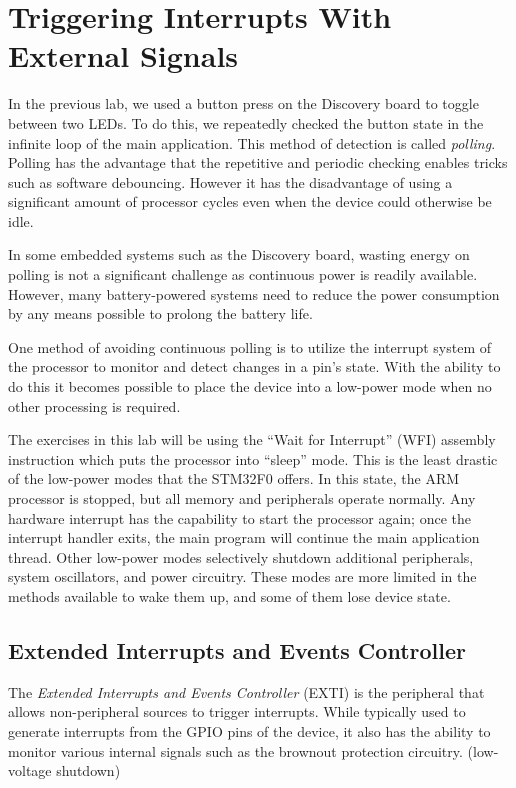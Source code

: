 \documentclass[11pt,fleqn]{book} %
\begin{document}
\section{Triggering Interrupts With External Signals}

In the previous lab, we used a button press on the Discovery board to toggle between two LEDs. To do this, we repeatedly checked the button state in the infinite loop of the main application. This method of detection is called \textit{polling}. Polling has the advantage that the repetitive and periodic checking enables tricks such as software debouncing. However it has the disadvantage of using a significant amount of processor cycles even when the device could otherwise be idle. 

In some embedded systems such as the Discovery board, wasting energy on polling is not a significant challenge as continuous power is readily available. However, many battery-powered systems need to reduce the power consumption by any means possible to prolong the battery life.

One method of avoiding continuous polling is to utilize the interrupt system of the processor to monitor and detect changes in a pin's state. With the ability to do this it becomes possible to place the device into a low-power mode when no other processing is required. 

The exercises in this lab will be using the ``Wait for Interrupt'' (WFI) assembly instruction which puts the processor into ``sleep'' mode. This is the least drastic of the low-power modes that the STM32F0 offers. In this state, the ARM processor is stopped, but all memory and peripherals operate normally. Any hardware interrupt has the capability to start the processor again; once the interrupt handler exits, the main program will continue the main application thread. Other low-power modes selectively shutdown additional peripherals, system oscillators, and power circuitry. These modes are more limited in the methods available to wake them up, and some of them lose device state.  

\subsection{Extended Interrupts and Events Controller} \label{exti}

The \textit{Extended Interrupts and Events Controller} (EXTI) is the peripheral that allows non-peripheral sources to trigger interrupts. While typically used to generate interrupts from the GPIO pins of the device, it also has the ability to monitor various internal signals such as the brownout protection circuitry. (low-voltage shutdown)
\end{document}
